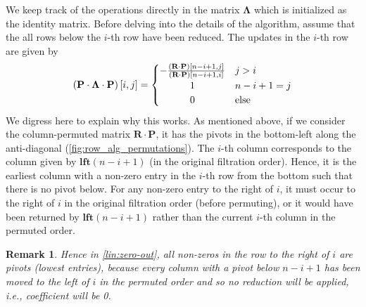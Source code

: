 \documentclass{article}
\newtheorem{remark}[theorem]{Remark}
\newcommand{\mat}[1]{\mathbf{#1}}
\newcommand{\low}{\mathbf{low}}
\newcommand{\lft}{\mathbf{lft}}
\DeclareMathOperator*{\argmin}{arg\,min}
\begin{document}
We keep track of the operations directly in the matrix $\mat{\Lambda}$ which is initialized as the identity matrix. %
Before delving into the details of the algorithm, assume that the all rows below the $i$-th row have been reduced. The updates in the $i$-th row are given by 
\[
    \left( \mat{P} \cdot \mat{\Lambda} \cdot \mat{P} \right)[i,j] =
        \begin{cases}
            -\frac{(\mat{R}\cdot \mat{P})[n-i+1,j]}{(\mat{R}\cdot \mat{P})[n-i+1,i]} &   j>i\\
            \hfil  1&n-i+1=j \\
            \hfil  0 &\mbox{else}
        \end{cases}
\]
We digress here to explain why this works. As mentioned above, if we consider the column-permuted matrix $\mat{R}\cdot \mat{P}$, it has the pivots in the bottom-left along the anti-diagonal (\cref{fig:row_alg_permutations}). The $i$-th column corresponds to the column given by $\lft  (n-i+1)$ (in the original filtration order). Hence, it is the earliest column with a non-zero entry in the $i$-th row from the bottom such that there is no pivot below. 
   For any non-zero entry to the right of $i$, it must occur to the right of $i$  in the original filtration order (before permuting), or it would have been returned by $\lft  (n-i+1)$ rather than the current $i$-th column in the permuted order. 
\begin{remark}
    \label{rem:pivots}
   Hence in \cref{lin:zero-out},  all non-zeros in the row to the right of $i$ are  pivots (lowest entries), because every column with a pivot below $n-i+1$ has been moved to the left of $i$ in the permuted order and so no reduction will be applied, i.e., coefficient will be 0.
\end{remark}
\end{document}
